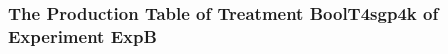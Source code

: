  \begin{frame}
 \fontsize{8pt}{9pt}\selectfont
 \frametitle{ The Production Table of Treatment BoolT4sgp4k of Experiment ExpB }

 \label{ExpBGrammarTable028.tex}  
 \end{frame}

